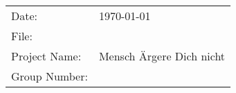 \thispagestyle{plain}
\hypersetup{pageanchor=false}
\begin{titlepage}
\enlargethispage{4.0cm}
\sffamily 								
\parbox{0.5\linewidth}{
\begin{flushleft}
\end{flushleft}
}				

\begin{center}

{\fontsize{20.74pt}{24pt}\selectfont
\textbf{\doctitle}\\[1.5ex]}
{\fontsize{14pt}{17pt}\selectfont
\textbf{\docsubtitle}\\[5ex]}

\end{center}

\begin{flushleft}
{\fontsize{12pt}{14pt}\selectfont
\begin{tabular}{ll}
Date:					& \quad \today \\
File:		   	        & \quad \docname  \\ 
Project Name:           & \quad Mensch Ärgere Dich nicht \\
Group Number:           & \quad 6 \\
\end{tabular}
}
\end{flushleft}

\end{titlepage}

%

\hypersetup{pageanchor=true}